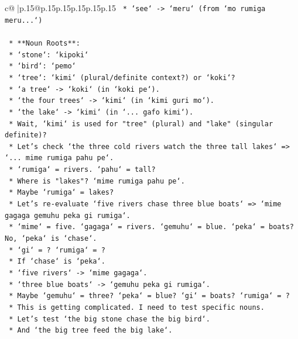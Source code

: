 \documentclass{article}
\begin{document}
{\begin{supertabular}{c@{$\;$}|p{.15\linewidth}@{}p{.15\linewidth}p{.15\linewidth}p{.15\linewidth}p{.15\linewidth}p{.15\linewidth}}
{{{\texttt{            *   `see` {-}> `meru` (from `mo rumiga meru...`)} \\
\\ 
\texttt{    *   **Noun Roots**:} \\
\texttt{        *   `stone`: `kipoki`} \\
\texttt{        *   `bird`: `pemo`} \\
\texttt{        *   `tree`: `kimi` (plural/definite context?) or `koki`?} \\
\texttt{            *   `a tree` {-}> `koki` (in `koki pe`).} \\
\texttt{            *   `the four trees` {-}> `kimi` (in `kimi guri mo`).} \\
\texttt{            *   `the lake` {-}> `kimi` (in `... gafo kimi`).} \\
\texttt{            *   Wait, `kimi` is used for "tree" (plural) and "lake" (singular definite)?} \\
\texttt{            *   Let's check `the three cold rivers watch the three tall lakes` => `... mime rumiga pahu pe`.} \\
\texttt{            *   `rumiga` = rivers. `pahu` = tall?} \\
\texttt{            *   Where is "lakes"? `mime rumiga pahu pe`.} \\
\texttt{            *   Maybe `rumiga` = lakes?} \\
\texttt{            *   Let's re{-}evaluate `five rivers chase three blue boats` => `mime gagaga gemuhu peka gi rumiga`.} \\
\texttt{            *   `mime` = five. `gagaga` = rivers. `gemuhu` = blue. `peka` = boats? No, `peka` is `chase`.} \\
\texttt{            *   `gi` = ? `rumiga` = ?} \\
\texttt{            *   If `chase` is `peka`.} \\
\texttt{            *   `five rivers` {-}> `mime gagaga`.} \\
\texttt{            *   `three blue boats` {-}> `gemuhu peka gi rumiga`.} \\
\texttt{            *   Maybe `gemuhu` = three? `peka` = blue? `gi` = boats? `rumiga` = ?} \\
\texttt{            *   This is getting complicated. I need to test specific nouns.} \\
\texttt{            *   Let's test `the big stone chase the big bird`.} \\
\texttt{            *   And `the big tree feed the big lake`.} \\
}}}
\end{supertabular}}
\end{document}
